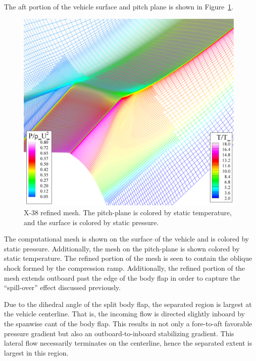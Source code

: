 The aft portion of the vehicle surface and pitch plane is shown in Figure~\ref{fig:x38_pitch_plane_amr}.
\begin{figure}[hbtp]
  \begin{center}
    \includegraphics[width=\textwidth]{figures/x38/refined_mesh_pitch}
    \caption[X-38 refined mesh.]{X-38 refined mesh. The pitch-plane is colored by static temperature, and the surface is colored by static pressure.\label{fig:x38_pitch_plane_amr}}
  \end{center}
\end{figure}
The computational mesh is shown on the surface of the vehicle and is colored by static pressure. Additionally, the mesh on the pitch-plane is shown colored by static temperature.  The refined portion of the mesh is seen to contain the oblique shock formed by the compression ramp.  Additionally, the refined portion of the mesh extends outboard past the edge of the body flap in order to capture the ``spill-over'' effect discussed previously.

Due to the dihedral angle of the split body flap, the separated region is largest at the vehicle centerline.  That is, the incoming flow is directed slightly inboard by the spanwise cant of the body flap.  This results in not only a fore-to-aft favorable pressure gradient but also an outboard-to-inboard stabilizing gradient.  This lateral flow necessarily terminates on the centerline, hence the separated extent is largest in this region.  

